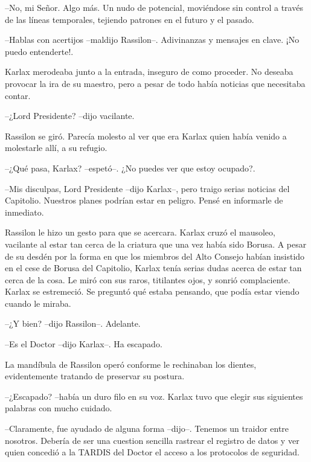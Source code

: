 --No, mi Señor. Algo más. Un nudo de potencial, moviéndose sin control a través de las líneas temporales, tejiendo patrones en el futuro y el pasado.

--Hablas con acertijos --maldijo Rassilon--. Adivinanzas y mensajes en clave. ¡No puedo entenderte!.



Karlax merodeaba junto a la entrada, inseguro de como proceder. No deseaba provocar la ira de su maestro, pero a pesar de todo había noticias que necesitaba contar. 



--¿Lord Presidente? --dijo vacilante.



Rassilon se giró. Parecía molesto al ver que era Karlax quien había venido a molestarle allí, a su refugio.



--¿Qué pasa, Karlax? --espetó--. ¿No puedes ver que estoy ocupado?.

--Mis disculpas, Lord Presidente --dijo Karlax--, pero traigo serias noticias del Capitolio. Nuestros planes podrían estar en peligro. Pensé en informarle de inmediato.



Rassilon le hizo un gesto para que se acercara. Karlax cruzó el mausoleo, vacilante al estar tan cerca de la criatura que una vez había sido Borusa. A pesar de su desdén por la forma en que los miembros del Alto Consejo habían insistido en el cese de Borusa del Capitolio, Karlax tenía serias dudas acerca de estar tan cerca de la cosa. Le miró con sus raros, titilantes ojos, y sonrió complaciente. Karlax se estremeció. Se preguntó qué estaba pensando, que podía estar viendo cuando le miraba.



--¿Y bien? --dijo Rassilon--. Adelante.

--Es el Doctor --dijo Karlax--. Ha escapado.



La mandíbula de Rassilon operó conforme le rechinaban los dientes, evidentemente tratando de preservar su postura. 



--¿Escapado? --había un duro filo en su voz. Karlax tuvo que elegir sus siguientes palabras con mucho cuidado.

--Claramente, fue ayudado de alguna forma --dijo--. Tenemos un traidor entre nosotros. Debería de ser una cuestion sencilla rastrear el registro de datos y ver quien concedió a la TARDIS del Doctor el acceso a los protocolos de seguridad.


